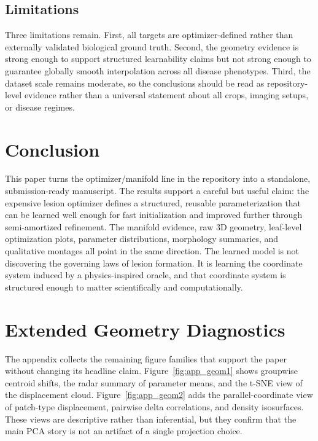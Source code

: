 \documentclass[11pt,a4paper]{article}
\begin{document}
\subsection{Limitations}
Three limitations remain.
First, all targets are optimizer-defined rather than externally validated biological ground truth.
Second, the geometry evidence is strong enough to support structured learnability claims but not strong enough to guarantee globally smooth interpolation across all disease phenotypes.
Third, the dataset scale remains moderate, so the conclusions should be read as repository-level evidence rather than a universal statement about all crops, imaging setups, or disease regimes.

\section{Conclusion}
This paper turns the optimizer/manifold line in the repository into a standalone, submission-ready manuscript.
The results support a careful but useful claim: the expensive lesion optimizer defines a structured, reusable parameterization that can be learned well enough for fast initialization and improved further through semi-amortized refinement.
The manifold evidence, raw 3D geometry, leaf-level optimization plots, parameter distributions, morphology summaries, and qualitative montages all point in the same direction.
The learned model is not discovering the governing laws of lesion formation.
It is learning the coordinate system induced by a physics-inspired oracle, and that coordinate system is structured enough to matter scientifically and computationally.

\appendix
\clearpage
\section{Extended Geometry Diagnostics}
The appendix collects the remaining figure families that support the paper without changing its headline claim.
Figure~\ref{fig:app_geom1} shows groupwise centroid shifts, the radar summary of parameter means, and the t-SNE view of the displacement cloud.
Figure~\ref{fig:app_geom2} adds the parallel-coordinate view of patch-type displacement, pairwise delta correlations, and density isosurfaces.
These views are descriptive rather than inferential, but they confirm that the main PCA story is not an artifact of a single projection choice.
\end{document}
